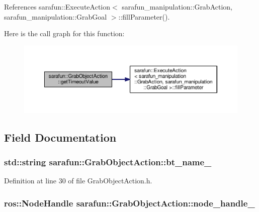 References sarafun\-::\-Execute\-Action$<$ sarafun\-\_\-manipulation\-::\-Grab\-Action, sarafun\-\_\-manipulation\-::\-Grab\-Goal $>$\-::fill\-Parameter().



Here is the call graph for this function\-:\nopagebreak
\begin{figure}[H]
\begin{center}
\leavevmode
\includegraphics[width=350pt]{db/d0c/classsarafun_1_1GrabObjectAction_a6e2ee834fda8bd8d0dbdc101c8acdd9c_a6e2ee834fda8bd8d0dbdc101c8acdd9c_cgraph}
\end{center}
\end{figure}




\subsection{Field Documentation}
\hypertarget{classsarafun_1_1GrabObjectAction_a99b30dab79220943e417769f1a3d4f36_a99b30dab79220943e417769f1a3d4f36}{
\subsubsection[{bt\-\_\-name\-\_\-}]{\setlength{\rightskip}{0pt plus 5cm}std\-::string sarafun\-::\-Grab\-Object\-Action\-::bt\-\_\-name\-\_\-\hspace{0.3cm}{\ttfamily [private]}}}\label{classsarafun_1_1GrabObjectAction_a99b30dab79220943e417769f1a3d4f36_a99b30dab79220943e417769f1a3d4f36}


Definition at line 30 of file Grab\-Object\-Action.\-h.

\hypertarget{classsarafun_1_1GrabObjectAction_add955e0266ed5eaf3b6f7b3b3bccd4ae_add955e0266ed5eaf3b6f7b3b3bccd4ae}{
\subsubsection[{node\-\_\-handle\-\_\-}]{\setlength{\rightskip}{0pt plus 5cm}ros\-::\-Node\-Handle sarafun\-::\-Grab\-Object\-Action\-::node\-\_\-handle\-\_\-\hspace{0.3cm}{\ttfamily [private]}}}\label{classsarafun_1_1GrabObjectAction_add955e0266ed5eaf3b6f7b3b3bccd4ae_add955e0266ed5eaf3b6f7b3b3bccd4ae}


